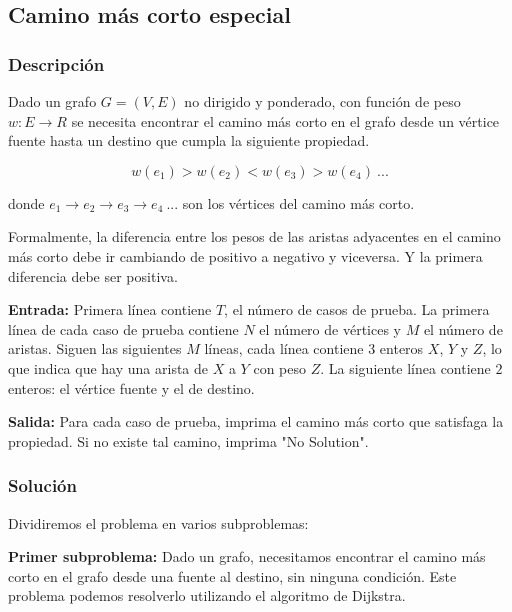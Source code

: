 \documentclass[12pt]{article}
\newcommand{\nl}{\vspace{0.3cm}}
\begin{document}
\subsection{Camino más corto especial}

\nl

\subsubsection{Descripción}

\nl

Dado un grafo $G = (V, E)$ no dirigido y ponderado, con función de peso $w: E \rightarrow R $ se necesita encontrar el camino más corto en el grafo desde un vértice fuente hasta un destino que cumpla la siguiente propiedad.

$$ w(e_1) > w(e_2) < w(e_3) > w(e_4) \ ...$$

donde $e_1 \rightarrow e_2 \rightarrow e_3 \rightarrow e_4 \ ... $ son los vértices del camino más corto.

\nl

Formalmente, la diferencia entre los pesos de las aristas adyacentes en el camino más corto debe ir cambiando de positivo a negativo y viceversa. Y la primera diferencia debe ser positiva.

\nl

\textbf{Entrada:} Primera línea contiene $T$, el número de casos de prueba. La primera línea de cada caso de prueba contiene $N$ el número de vértices y $M$ el número de aristas. Siguen las siguientes $M$ líneas, cada línea contiene $3$ enteros $X$, $Y$ y $Z$, lo que indica que hay una arista de $X$ a $Y$ con peso $Z$. La siguiente línea contiene $2$ enteros: el vértice fuente y el de destino.

\nl

\textbf{Salida:} Para cada caso de prueba, imprima el camino más corto que satisfaga la propiedad. Si no existe tal camino, imprima "No Solution".

\newpage

\subsubsection{Solución}

Dividiremos el problema en varios subproblemas:

\nl

\textbf{Primer subproblema:} Dado un grafo, necesitamos encontrar el camino más corto en el grafo desde una fuente al destino, sin ninguna condición. Este problema podemos resolverlo utilizando el algoritmo de Dijkstra.
\end{document}

